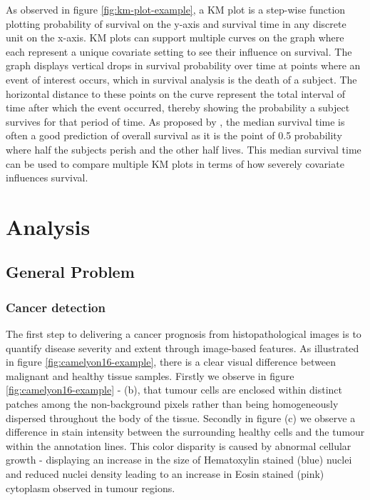 \documentclass{l4proj}
\begin{document}
As observed in figure \ref{fig:km-plot-example}, a KM plot is a step-wise function plotting probability of survival on the y-axis and survival time in any discrete unit on the x-axis. KM plots can support multiple curves on the graph where each represent a unique covariate setting to see their influence on survival. The graph displays vertical drops in survival probability over time at points where an event of interest occurs, which in survival analysis is the death of a subject. The horizontal distance to these points on the curve represent the total interval of time after which the event occurred, thereby showing the probability a subject survives for that period of time. As proposed by \cite{bewick2004statistics}, the median survival time is often a good prediction of overall survival as it is the point of 0.5 probability where half the subjects perish and the other half lives. This median survival time can be used to compare multiple KM plots in terms of how severely  covariate influences survival.  

\chapter{Analysis}
\section{General Problem}
\subsection{Cancer detection}
The first step to delivering a cancer prognosis from histopathological images is to quantify disease severity and extent through image-based features. As illustrated in figure \ref{fig:camelyon16-example}, there is a clear visual difference between malignant and healthy tissue samples. Firstly we observe in figure \ref{fig:camelyon16-example} - (b), that tumour cells are enclosed within distinct patches among the non-background pixels rather than being homogeneously dispersed throughout the body of the tissue. Secondly in figure (c) we observe a difference in stain intensity between the surrounding healthy cells and the tumour within the annotation lines. This color disparity is caused by abnormal cellular growth - displaying an increase in the size of Hematoxylin stained (blue) nuclei and reduced nuclei density leading to an increase in Eosin stained (pink) cytoplasm observed in tumour regions. 
\end{document}

